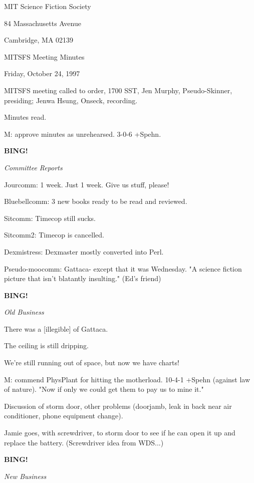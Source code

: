 \documentclass[12pt]{article}
\newcommand{\bing}{{\bf BING!} }
\newcommand{\goto}[1]{\bing \vskip 12pt \centerline{{\em{#1}}}}
\begin{document}
\begin{center}

MIT Science Fiction Society 

84 Massachusetts Avenue

Cambridge, MA 02139

\vspace{12pt}

MITSFS Meeting Minutes 

Friday, October 24, 1997

\end{center}
 
\vspace{18pt}

\setlength{\parskip}{6pt}

\noindent
MITSFS meeting called to order, 1700 SST,
Jen Murphy, Pseudo-Skinner, presiding; Jenwa Hsung, Onseck, recording.

Minutes read.

M: approve minutes as unrehearsed. 3-0-6 +Spehn.

\goto{Committee Reports}

Jourcomm: 1 week. Just 1 week. Give us stuff, please!

Bluebellcomm: 3 new books ready to be read and reviewed.

Sitcomm: Timecop still sucks.

Sitcomm2: Timecop is cancelled.

Dexmistress: Dexmaster mostly converted into Perl.

Pseudo-moocomm: Gattaca- except that it was Wednesday. "A science fiction picture that isn't blatantly insulting." (Ed's friend)

\goto{Old Business}

There was a [illegible] of Gattaca.

The ceiling is still dripping.

We're still running out of space, but now we have charts!

M: commend PhysPlant for hitting the motherload. 10-4-1 +Spehn (against law of nature). "Now if only we could get them to pay us to mine it."

Discussion of storm door, other problems (doorjamb, leak in back near air conditioner, phone equipment change).

Jamie goes, with screwdriver, to storm door to see if he can open it up and replace the battery. (Screwdriver idea from WDS...)

\goto{New Business}
\end{document}
